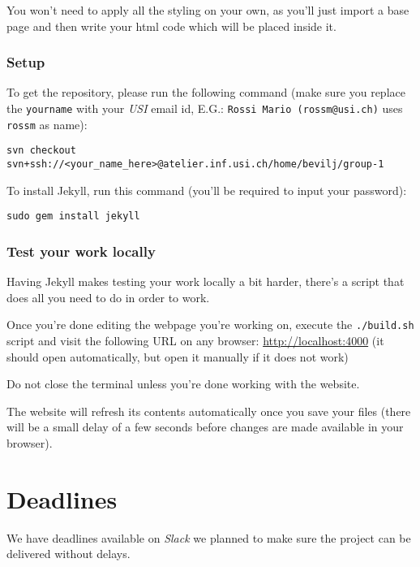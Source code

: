 \documentclass[hidelinks,12pt,a4paper,numbers=enddot]{scrartcl}
\begin{document}
You won't need to apply all the styling on your own, as you'll just
import a base page and then write your html code which will be placed inside it.

\subsubsection{Setup}\label{setup}

To get the repository, please run the following command (make sure you
replace the \texttt{yourname} with your \emph{USI} email id,
E.G.: \texttt{Rossi\ Mario\ (rossm@usi.ch)} uses
\texttt{rossm} as name):

\begin{verbatim}
svn checkout svn+ssh://<your_name_here>@atelier.inf.usi.ch/home/bevilj/group-1
\end{verbatim}

To install Jekyll, run this command (you'll be required to input your
password):

\begin{verbatim}
sudo gem install jekyll
\end{verbatim}

\subsubsection{Test your work locally}\label{test-your-work-locally}

Having Jekyll makes testing your work locally a bit harder, there's a
script that does all you need to do in order to work.

Once you're done editing the webpage you're working on, execute the
\texttt{./build.sh} script and visit the following URL on any browser:
\url{http://localhost:4000} (it should open automatically, but open it
manually if it does not work)

Do not close the terminal unless you're done working with the website.

The website will refresh its contents automatically once you save your
files (there will be a small delay of a few seconds before changes are
made available in your browser).

\section{Deadlines}\label{deadlines}

We have deadlines available on \emph{Slack} we planned to make sure the
project can be delivered without delays.
\end{document}
